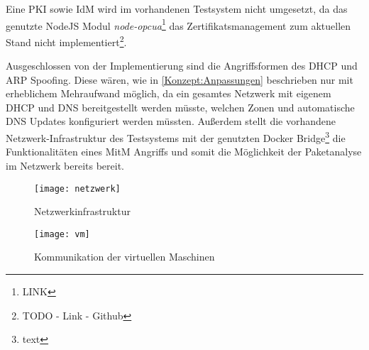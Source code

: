Eine \ac{PKI} sowie \ac{IdM} wird im vorhandenen Testsystem nicht umgesetzt, da das genutzte NodeJS Modul \textit{node-opcua}\footnote{LINK} das Zertifikatsmanagement zum aktuellen Stand nicht implementiert\footnote{TODO - Link - Github}.

Ausgeschlossen von der Implementierung sind die Angriffsformen des \ac{DHCP} und \ac{ARP} Spoofing. Diese wären, wie in \autoref{Konzept:Anpassungen} beschrieben nur mit erheblichem Mehraufwand möglich, da ein gesamtes Netzwerk mit eigenem \ac{DHCP} und \ac{DNS} bereitgestellt werden müsste, welchen Zonen und automatische DNS Updates konfiguriert werden müssten. Außerdem stellt die vorhandene Netzwerk-Infrastruktur des Testsystems mit der genutzten Docker Bridge\footnote{text} die Funktionalitäten eines \ac{MitM} Angriffs und somit die Möglichkeit der Paketanalyse im Netzwerk bereits bereit.


\begin{figure}[h]
    \centering
    \texttt{[image: netzwerk]}
    \caption{Netzwerkinfrastruktur} 
    \label{Konzept:Netzwerkkonzept}
  \end{figure}
  
  \clearpage

  \begin{figure}[h]
    \centering
    \texttt{[image: vm]}
    \caption{Kommunikation der virtuellen Maschinen} 
    \label{Konzept:VMKommunikation}
  \end{figure}
  
  \clearpage